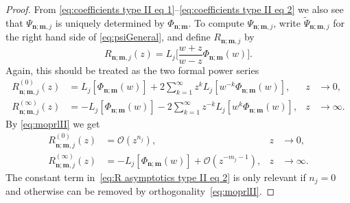 \documentclass[reqno,centertags,11pt,draft]{amsart}
\begin{document}
\begin{proof}
    From \eqref{eq:coefficients type II eq 1}--\eqref{eq:coefficients type II eq 2} we also see that $\Psi_{\bm{n};\bm{m},j}$ is uniquely determined by $\Phi_{\bm{n};\bm{m}}$. To compute $\Psi_{\bm{n};\bm{m},j}$, write $\widetilde{\Psi}_{\bm{n};\bm{m},j}$ for the right hand side of \eqref{eq:psiGeneral}, and define $R_{\bm{n};\bm{m},j}$ by
    \begin{equation}
        R_{\bm{n};\bm{m},j}(z) = L_j\Big[\frac{w+z}{w-z}\Phi_{\bm{n};\bm{m}}(w) \Big].
    \end{equation}
    Again, this should be treated as the two formal power series
    \begin{align}\label{eq:secondKindFunctionTypeII 1}
    R^{(0)}_{\bm{n};\bm{m},j}(z) 
        & =  L_j[\Phi_{\bm{n};\bm{m}}(w)]+ 2\sum_{k=1}^\infty z^k L_j[w^{-k}\Phi_{\bm{n};\bm{m}}(w)],  & z & \to 0,  
        \\ \label{eq:secondKindFunctionTypeII 2}
    R^{(\infty)}_{\bm{n};\bm{m},j}(z) & =  -L_j[\Phi_{\bm{n};\bm{m}}(w)] - 2\sum_{k=1}^\infty z^{-k} L_j[w^{k}\Phi_{\bm{n};\bm{m}}(w)], & z & \to \infty. 
    \end{align}
    By \eqref{eq:moprlII}
    we get
    \begin{align}\label{eq:R asymptotics type II eq 1}
        R^{(0)}_{\bm{n};\bm{m},j}(z) 
        & =  \mathcal{O}(z^{n_j}),  & z & \to 0, \\ \label{eq:R asymptotics type II eq 2}
        R^{(\infty)}_{\bm{n};\bm{m},j}(z) & = -L_j[\Phi_{\bm{n};\bm{m}}(w)] + \mathcal{O}(z^{-m_j-1}),  & z & \to \infty.
    \end{align}
    The constant term in~\eqref{eq:R asymptotics type II eq 2} is only relevant if $n_j=0$ and otherwise can be removed by orthogonality~\eqref{eq:moprlII}. 
    

\end{proof}
\end{document}
